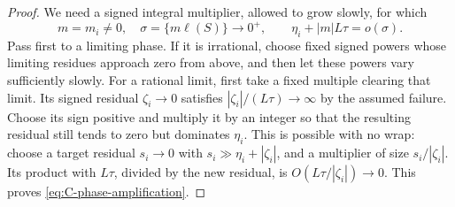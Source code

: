 \begin{proof}
We need a signed integral multiplier, allowed to grow slowly, for which
\begin{equation}\label{eq:C-phase-amplification}
 m=m_i\ne0,\quad\sigma=\{m\ell(S)\}\longrightarrow0^+,
                    \qquad\eta_i+|m|L\tau=o(\sigma).
\end{equation}
Pass first to a limiting phase.  If it is irrational, choose fixed
signed powers whose limiting residues approach zero from above, and
then let these powers vary sufficiently slowly.  For a rational limit,
first take a fixed multiple clearing that limit.  Its signed residual
$\zeta_i\to0$ satisfies $|\zeta_i|/(L\tau)\to\infty$ by the assumed
failure.  Choose its sign positive and multiply it by an integer so
that the resulting residual still tends to zero but dominates
$\eta_i$.  This is possible with no wrap: choose a target residual
$s_i\to0$ with $s_i\gg\eta_i+|\zeta_i|$, and a multiplier of size
$s_i/|\zeta_i|$.  Its product with $L\tau$, divided by the new
residual, is $O(L\tau/|\zeta_i|)\to0$.  This proves
\eqref{eq:C-phase-amplification}.


\end{proof}
